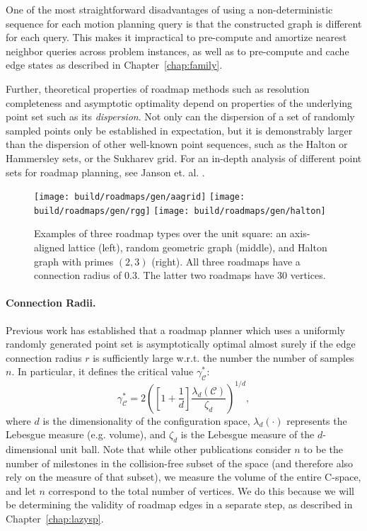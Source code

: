 One of the most straightforward disadvantages of using a
non-deterministic sequence for each motion planning query
is that the constructed graph is different for each query.
This makes it impractical to pre-compute and amortize nearest
neighbor queries across problem instances,
as well as to pre-compute and cache edge states as described in
Chapter~\ref{chap:family}.

Further,
theoretical properties of roadmap methods
such as resolution completeness and asymptotic optimality
depend on properties of the underlying point set
such as its \emph{dispersion}.
Not only can the dispersion of a set of randomly sampled points
only be established in expectation,
but it is demonstrably larger than the dispersion of other
well-known point sequences,
such as the Halton or Hammersley sets,
or the Sukharev grid.
For an in-depth analysis of different point sets for roadmap
planning, see Janson et. al. \citep{janson2015deterministicsampling}.

\begin{figure}
   \centering
   \texttt{[image: build/roadmaps/gen/aagrid]}
   \;
   \texttt{[image: build/roadmaps/gen/rgg]}
   \;
   \texttt{[image: build/roadmaps/gen/halton]}
   \caption{Examples of three roadmap types over the unit square:
      an axis-aligned lattice (left),
      random geometric graph (middle),
      and Halton graph with primes $(2,3)$ (right).
      All three roadmaps have a connection radius of 0.3.
      The latter two roadmaps have 30 vertices.}
\end{figure}

\paragraph{Connection Radii.}
Previous work \citep{karaman2011samplingoptimal} has established
that a roadmap planner which uses a uniformly randomly generated
point set is asymptotically optimal almost surely
if the edge connection radius $r$ is sufficiently large w.r.t.
the number the number of samples $n$.
In particular,
it defines the critical value $\gamma^*_{\mathcal{C}}$:
\begin{equation}
   \gamma^*_{\mathcal{C}}
      = 2 \left( \left[ 1 + \frac{1}{d} \right]
         \frac{\lambda_d(\mathcal{C})}{\zeta_d} \right)^{1/d},
\end{equation}
where $d$ is the dimensionality of the configuration space,
$\lambda_d(\cdot)$ represents the Lebesgue measure (e.g. volume),
and $\zeta_d$ is the Lebesgue measure of the $d$-dimensional unit ball.
Note that while other publications consider $n$ to be the number
of milestones in the collision-free subset of the space
(and therefore also rely on the measure of that subset),
we measure the volume of the entire C-space,
and let $n$ correspond to the total number of vertices.
We do this because we will be determining the validity of roadmap edges
in a separate step,
as described in Chapter~\ref{chap:lazysp}.

